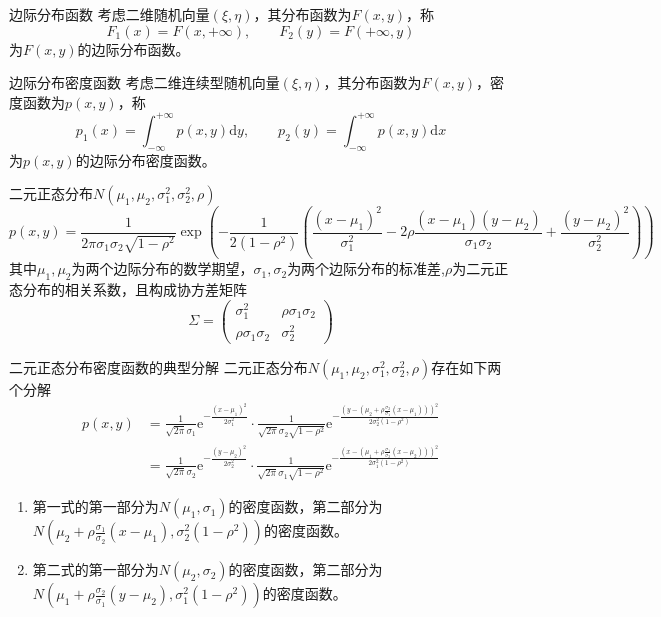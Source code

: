 \documentclass[lang = cn, scheme = chinese, thmcnt = section]{elegantbook}
\begin{document}
\begin{definition}{边际分布函数}
	考虑二维随机向量$(\xi,\eta)$，其分布函数为$F(x,y)$，称
	$$
	F_1(x)=F(x,+\infty),\qquad F_2(y)=F(+\infty,y)
	$$
	为$F(x,y)$的边际分布函数。
\end{definition}

\begin{definition}{边际分布密度函数}
	考虑二维连续型随机向量$(\xi,\eta)$，其分布函数为$F(x,y)$，密度函数为$p(x,y)$，称
	$$
	p_1(x)=\int_{-\infty}^{+\infty}{p(x,y)\mathrm{d}y},\qquad p_2(y)=\int_{-\infty}^{+\infty}{p(x,y)\mathrm{d}x}
	$$
	为$p(x,y)$的边际分布密度函数。
\end{definition}

\begin{definition}{二元正态分布$N(\mu_1,\mu_2,\sigma_1^2,\sigma_2^2,\rho)$}
	$$
	p(x,y)=\frac{1}{2\pi\sigma_1\sigma_2\sqrt{1-\rho^2}}
	\exp\left(-\frac{1}{2(1-\rho^2)}(\frac{(x-\mu_1)^2}{\sigma_1^2}-2\rho\frac{(x-\mu_1)(y-\mu_2)}{\sigma_1\sigma_2}+\frac{(y-\mu_2)^2}{\sigma_2^2})\right)
	$$
	其中$\mu_1,\mu_2$为两个边际分布的数学期望，$\sigma_1,\sigma_2$为两个边际分布的标准差,$\rho$为二元正态分布的相关系数，且构成协方差矩阵
	$$
	\Sigma=\left(
	\begin{matrix}
		\sigma_1^2&\rho\sigma_1\sigma_2\\
		\rho\sigma_1\sigma_2&\sigma_2^2
	\end{matrix}
	\right)
	$$
\end{definition}

\begin{proposition}{二元正态分布密度函数的典型分解}
	二元正态分布$N(\mu_1,\mu_2,\sigma_1^2,\sigma_2^2,\rho)$存在如下两个分解
	\begin{align*}
		p(x,y)
		&=\frac{1}{\sqrt{2\pi}\sigma_1}
		\mathrm{e}^{-\frac{(x-\mu_1)^2}{2\sigma_1^2}}
		\cdot
		\frac{1}{\sqrt{2\pi}\sigma_2\sqrt{1-\rho^2}}
		\mathrm{e}^{-\frac{(y-(\mu_2+\rho\frac{\sigma_2}{\sigma_1}(x-\mu_1)))^2}{2\sigma_2^2(1-\rho^2)}}\\
		&=\frac{1}{\sqrt{2\pi}\sigma_2}
		\mathrm{e}^{-\frac{(y-\mu_2)^2}{2\sigma_2^2}}
		\cdot
		\frac{1}{\sqrt{2\pi}\sigma_1\sqrt{1-\rho^2}}
		\mathrm{e}^{-\frac{(x-(\mu_1+\rho\frac{\sigma_1}{\sigma_2}(x-\mu_2)))^2}{2\sigma_1^2(1-\rho^2)}}
	\end{align*}
	\begin{enumerate}
		\item 第一式的第一部分为$N(\mu_1,\sigma_1)$的密度函数，第二部分为$N(\mu_2+\rho\frac{\sigma_1}{\sigma_2}(x-\mu_1),\sigma_2^2(1-\rho^2))$的密度函数。
		\item 第二式的第一部分为$N(\mu_2,\sigma_2)$的密度函数，第二部分为$N(\mu_1+\rho\frac{\sigma_2}{\sigma_1}(y-\mu_2),\sigma_1^2(1-\rho^2))$的密度函数。
	\end{enumerate}
\end{proposition}
\end{document}
